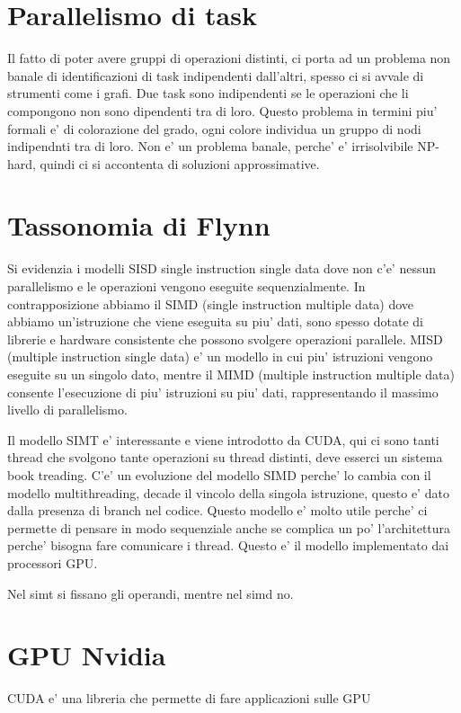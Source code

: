 \section{Parallelismo di task}
Il fatto di poter avere gruppi di operazioni distinti, ci porta ad un problema non banale di identificazioni di task indipendenti dall'altri, spesso ci si avvale di strumenti come i grafi. Due task sono indipendenti se le operazioni che li compongono non sono dipendenti tra di loro. Questo problema in termini piu' formali e' di colorazione del grado, ogni colore individua un gruppo di nodi indipendnti tra di loro.
Non e' un problema banale, perche' e' irrisolvibile NP-hard, quindi ci si accontenta di soluzioni approssimative.

\section{Tassonomia di Flynn}
Si evidenzia i modelli SISD single instruction single data dove non c'e' nessun parallelismo e le operazioni vengono eseguite sequenzialmente.
In contrapposizione abbiamo il SIMD (single instruction multiple data) dove abbiamo un'istruzione che viene eseguita su piu' dati, sono spesso dotate di librerie e hardware consistente che possono svolgere operazioni parallele.
MISD (multiple instruction single data) e' un modello in cui piu' istruzioni vengono eseguite su un singolo dato, mentre il MIMD (multiple instruction multiple data) consente l'esecuzione di piu' istruzioni su piu' dati, rappresentando il massimo livello di parallelismo.

Il modello SIMT e' interessante e viene introdotto da CUDA, qui ci sono tanti thread che svolgono tante operazioni su thread distinti, deve esserci un sistema book treading. C'e' un evoluzione del modello SIMD perche' lo cambia con il modello multithreading, decade il vincolo della singola istruzione, questo e' dato dalla presenza di branch nel codice. Questo modello e' molto utile perche' ci permette di pensare in modo sequenziale anche se complica un po' l'architettura perche' bisogna fare comunicare i thread. Questo e' il modello implementato dai processori GPU.


Nel simt si fissano gli operandi, mentre nel simd no.

\section{GPU Nvidia}
CUDA e' una libreria che permette di fare applicazioni sulle GPU

